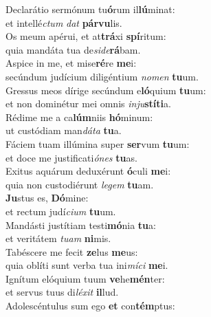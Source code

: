 \evenverse Declarátio sermónum tu\textbf{ó}rum il\textbf{lú}minat:~\*\\
\evenverse et intellé\textit{ctum} \textit{dat} \textbf{pár}\textbf{vu}lis.\\
\oddverse Os meum apérui, et at\textbf{trá}xi \textbf{spí}ritum:~\*\\
\oddverse quia mandáta tua de\textit{si}\textit{de}\textbf{rá}bam.\\
\evenverse Aspice in me, et mise\textbf{ré}re \textbf{me}i:~\*\\
\evenverse secúndum judícium diligéntium \textit{no}\textit{men} \textbf{tu}um.\\
\oddverse Gressus meos dírige secúndum e\textbf{ló}quium \textbf{tu}um:~\*\\
\oddverse et non dominétur mei omnis \textit{in}\textit{ju}\textbf{stí}\textbf{ti}a.\\
\evenverse Rédime me a ca\textbf{lúm}niis \textbf{hó}minum:~\*\\
\evenverse ut custódiam man\textit{dá}\textit{ta} \textbf{tu}a.\\
\oddverse Fáciem tuam illúmina super \textbf{ser}vum \textbf{tu}um:~\*\\
\oddverse et doce me justificati\textit{ó}\textit{nes} \textbf{tu}as.\\
\evenverse Exitus aquárum deduxérunt \textbf{ó}culi \textbf{me}i:~\*\\
\evenverse quia non custodiérunt \textit{le}\textit{gem} \textbf{tu}am.\\
\oddverse \textbf{Ju}stus es, \textbf{Dó}mine:~\*\\
\oddverse et rectum judí\textit{ci}\textit{um} \textbf{tu}um.\\
\evenverse Mandásti justítiam testi\textbf{mó}nia \textbf{tu}a:~\*\\
\evenverse et veritátem \textit{tu}\textit{am} \textbf{ni}mis.\\
\oddverse Tabéscere me fecit \textbf{ze}lus \textbf{me}us:~\*\\
\oddverse quia oblíti sunt verba tua ini\textit{mí}\textit{ci} \textbf{me}i.\\
\evenverse Ignítum elóquium tuum \textbf{ve}he\textbf{mén}ter:~\*\\
\evenverse et servus tuus di\textit{lé}\textit{xit} \textbf{il}lud.\\
\oddverse Adolescéntulus sum ego \textbf{et} con\textbf{tém}ptus:~\*\\
